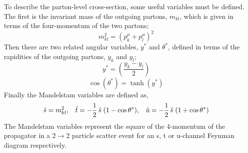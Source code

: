 To describe the parton-level cross-section, some useful variables must be defined.
The first is the invariant mass of the outgoing partons, $m_{kl}$, which is given in terms of the four-momentum of the two partons;
\begin{equation}
  m_{kl}^2 = (p^\mu_k + p^\mu_l)^2  
\end{equation}
\noindent
Then there are two related angular variables, $y^*$ and $\theta^*$,
defined in terms of the rapidities of the outgoing partons, $y_k$ and $y_l$;
\begin{equation}
  y^* = (\frac{y_k - y_l}{2})
\end{equation}
\begin{equation}
  \cos(\theta^*) = \tanh(y^*)
\end{equation}
\noindent
Finally the Mandelstam variables are defined as, %
\begin{equation}
  \hat{s} = m_{kl}^2, \hspace{3mm}  \hat{t} = -\frac{1}{2}\,\hat{s}\hspace{1mm}(1 - \cos{\theta^*}), \hspace{3mm} \hat{u} = - \frac{1}{2}\,\hat{s}\hspace{1mm}(1+\cos{\theta^*})
  \label{eqn:theo-mandy}
\end{equation}
The Mandelstam variables represent the square of the 4-momentum of the propagator in a 2$\to$2 particle scatter event
for an s, t or u-channel Feynman diagram respectively.


